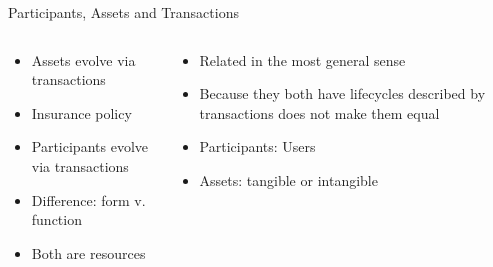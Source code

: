 \documentclass[pdf,table]{beamer}
\begin{document}
\begin{frame}{Participants, Assets and Transactions}
	\begin{columns}[T]
		\begin{column}{0.48\textwidth}
			\begin{itemize}
				\item Assets evolve via transactions
				\item Insurance policy %
				\item Participants evolve via transactions
				\item Difference: form v. function
				\item Both are resources %
			\end{itemize}
		\end{column}
		\begin{column}{0.48\textwidth}
			\begin{itemize}
				\item Related in the most general sense
				\item Because they both have lifecycles described by transactions does not make them equal
				\item Participants: Users
				\item Assets: tangible or intangible
			\end{itemize}
		\end{column}
	\end{columns}	
\end{frame}
\end{document}
